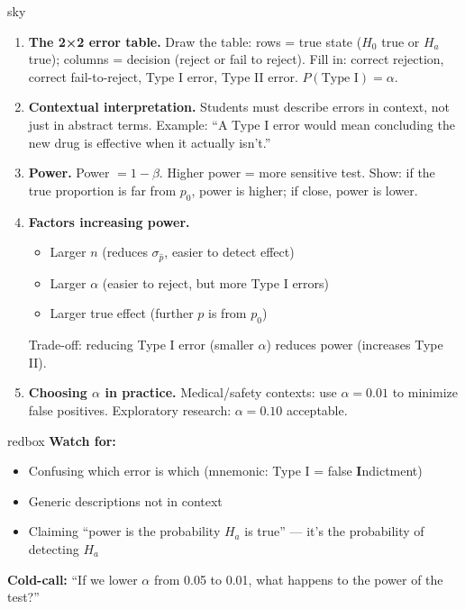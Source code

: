 \documentclass[10pt]{article}
\begin{document}
\begin{skillbox}[Lesson]{sky}
    \begin{enumerate}[leftmargin=1.4em, label=\arabic*.]
        \item \textbf{The 2×2 error table.} Draw the table: rows = true state ($H_0$ true or $H_a$ true);
              columns = decision (reject or fail to reject). Fill in: correct rejection, correct fail-to-reject,
              Type I error, Type II error. $P(\text{Type I}) = \alpha$.

        \item \textbf{Contextual interpretation.} Students must describe errors in context, not just
              in abstract terms. Example: ``A Type I error would mean concluding the new drug is
              effective when it actually isn't.''

        \item \textbf{Power.} Power $= 1-\beta$. Higher power = more sensitive test. Show: if
              the true proportion is far from $p_0$, power is higher; if close, power is lower.

        \item \textbf{Factors increasing power.}
              \begin{itemize}
                  \item Larger $n$ (reduces $\sigma_{\hat p}$, easier to detect effect)
                  \item Larger $\alpha$ (easier to reject, but more Type I errors)
                  \item Larger true effect (further $p$ is from $p_0$)
              \end{itemize}
              Trade-off: reducing Type I error (smaller $\alpha$) reduces power (increases Type II).

        \item \textbf{Choosing $\alpha$ in practice.} Medical/safety contexts: use $\alpha=0.01$ to
              minimize false positives. Exploratory research: $\alpha=0.10$ acceptable.
    \end{enumerate}
\end{skillbox}

\begin{skillbox}{redbox}
    \textbf{Watch for:}
    \begin{itemize}[leftmargin=1.2em]
        \item Confusing which error is which (mnemonic: Type I = false \textbf{I}ndictment)
        \item Generic descriptions not in context
        \item Claiming ``power is the probability $H_a$ is true'' --- it's the probability of detecting $H_a$
    \end{itemize}
    \textbf{Cold-call:} ``If we lower $\alpha$ from 0.05 to 0.01, what happens to the power of the test?''
\end{skillbox}
\end{document}
